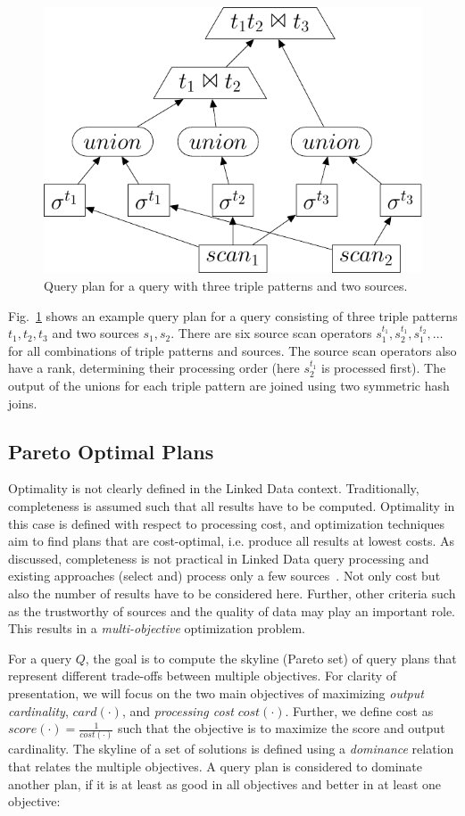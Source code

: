 \begin{figure}[htb]
  \centering
  \includegraphics[width=0.6\linewidth]{figs/plan.pdf}
  \caption{Query plan for a query with three triple patterns and two
    sources.}
\label{fig:plan}
\end{figure}

\begin{example}
  Fig.~\ref{fig:plan} shows an example query plan for a query
  consisting of three triple patterns $t_1,t_2,t_3$ and two 
  sources $s_1,s_2$. There are six source scan operators $s_1^{t_1},
  s_2^{t_1}, s_1^{t_2}, \ldots$ for all combinations of triple
  patterns and sources. The source scan operators also have a rank,
  determining their processing order (here $s_2^{t_1}$ is processed
  first). The output of the unions for each triple pattern are joined
  using two symmetric hash joins. 
\end{example}


\subsection{Pareto Optimal Plans} 
Optimality is not clearly defined in the Linked Data context. Traditionally, completeness is assumed such that all results have to be computed. Optimality in this case is defined with respect to processing cost, and optimization techniques aim to find plans that are cost-optimal, i.e. produce all results at lowest costs. As discussed, completeness is not practical in Linked Data query processing and existing approaches (select and) process only a few sources~\cite{harth_data_2010,ladwig_linked_2010}. Not only cost but also the number of results have to be considered here. Further, other criteria such as the trustworthy of sources and the quality of data may play an important role. This results in a \emph{multi-objective} optimization problem. 

For a query $Q$, %
the goal is to compute the skyline (Pareto set) of query plans that represent different trade-offs between multiple objectives. For clarity of presentation, we will focus on the two main objectives of maximizing \emph{output cardinality}, $card(\cdot)$, and \emph{processing cost} $cost(\cdot)$. Further, we define cost as $score(\cdot) = \frac{1}{cost(\cdot)}$ such that the objective is to maximize the score and output cardinality.  
The skyline of a set of solutions is defined using a \emph{dominance}
relation that relates the multiple objectives. A query plan is considered to dominate another plan, if it is at least as good in all objectives and better in at least one objective:

